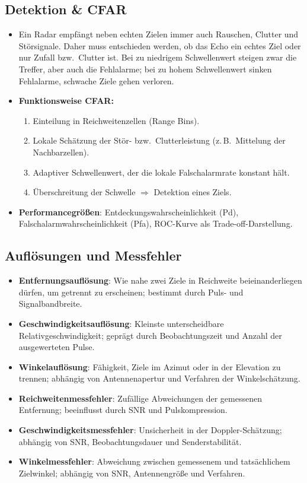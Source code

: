 \subsection{Detektion \& CFAR}
\begin{itemize}
  \item Ein Radar empfängt neben echten Zielen immer auch Rauschen, Clutter und Störsignale.
        Daher muss entschieden werden, ob das Echo ein echtes Ziel oder nur Zufall bzw.\ Clutter ist.
        Bei zu niedrigem Schwellenwert steigen zwar die Treffer, aber auch die Fehlalarme;
        bei zu hohem Schwellenwert sinken Fehlalarme, schwache Ziele gehen verloren.
  \item \textbf{Funktionsweise CFAR:}
        \begin{enumerate}
          \item Einteilung in Reichweitenzellen (Range Bins).
          \item Lokale Schätzung der Stör- bzw.\ Clutterleistung (z.\,B.\ Mittelung der Nachbarzellen).
          \item Adaptiver Schwellenwert, der die lokale Falschalarmrate konstant hält.
          \item Überschreitung der Schwelle $\Rightarrow$ Detektion eines Ziels.
        \end{enumerate}
  \item \textbf{Performancegrößen}: Entdeckungswahrscheinlichkeit (Pd), Falschalarmwahrscheinlichkeit (Pfa), ROC-Kurve als Trade-off-Darstellung.
\end{itemize}

\subsection{Auflösungen und Messfehler}
\begin{itemize}
  \item \textbf{Entfernungsauflösung}: Wie nahe zwei Ziele in Reichweite beieinanderliegen dürfen, um getrennt zu erscheinen;
        bestimmt durch Puls- und Signalbandbreite.
  \item \textbf{Geschwindigkeitsauflösung}: Kleinste unterscheidbare Relativgeschwindigkeit; geprägt durch Beobachtungszeit
        und Anzahl der ausgewerteten Pulse.
  \item \textbf{Winkelauflösung}: Fähigkeit, Ziele im Azimut oder in der Elevation zu trennen; abhängig von Antennenapertur und Verfahren der Winkelschätzung.
  \item \textbf{Reichweitenmessfehler}: Zufällige Abweichungen der gemessenen Entfernung; beeinflusst durch SNR und Pulskompression.
  \item \textbf{Geschwindigkeitsmessfehler}: Unsicherheit in der Doppler-Schätzung; abhängig von SNR, Beobachtungsdauer und Senderstabilität.
  \item \textbf{Winkelmessfehler}: Abweichung zwischen gemessenem und tatsächlichem Zielwinkel; abhängig von SNR, Antennengröße und Verfahren.
\end{itemize}

